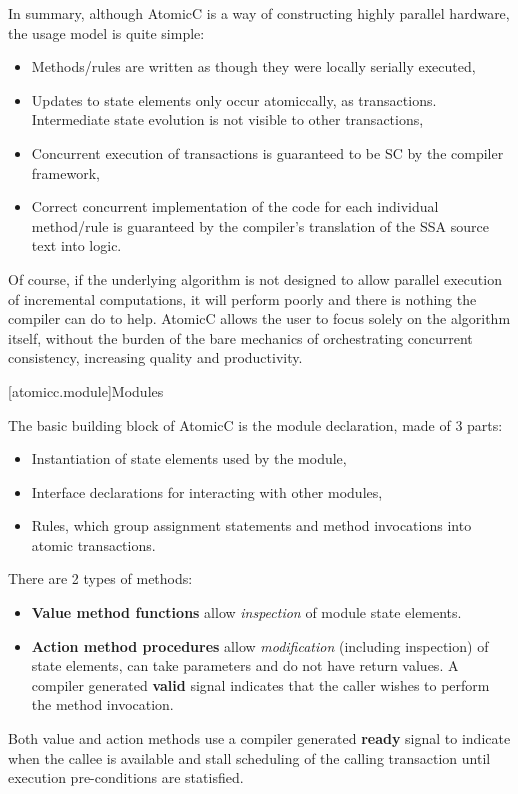 In summary, although AtomicC is a way of constructing highly parallel hardware,
the usage model is quite simple:
\begin{itemize}
\item Methods/rules are written as though they were locally serially executed,
\item Updates to state elements only occur atomiccally, as transactions.
Intermediate state evolution is not visible to other transactions,
\item Concurrent execution of transactions is guaranteed to be SC by the compiler framework,
\item Correct concurrent implementation of the code for each individual method/rule
is guaranteed by the compiler's
translation of the SSA source text into logic.
\end{itemize}
Of course, if the underlying algorithm is not designed to allow parallel
execution of incremental computations, it will perform poorly and there
is nothing the compiler can do to help.  AtomicC allows
the user to focus solely on the algorithm itself,
without the burden of the bare mechanics of orchestrating concurrent consistency,
increasing quality and productivity.

[atomicc.module]{Modules}

The basic building block of AtomicC is the module declaration, made of 3 parts:
\begin{itemize}
\item Instantiation of state elements used by the module,
\item Interface declarations for interacting with other modules,
\item Rules, which group assignment statements and method invocations into atomic transactions.
\end{itemize}

There are 2 types of methods:
\begin{itemize}
\item \textbf{Value method functions} allow \textit{inspection} of module state elements.
\item \textbf{Action method procedures} allow \textit{modification}
(including inspection) of state elements,
can take parameters and do not have return values.
A compiler generated
\textbf{valid} signal indicates that the caller wishes to perform the method invocation.
\end{itemize}

Both value and action methods use a compiler generated \textbf{ready} signal
to indicate when the callee is available and
stall scheduling of the calling transaction until
execution pre-conditions are statisfied.

